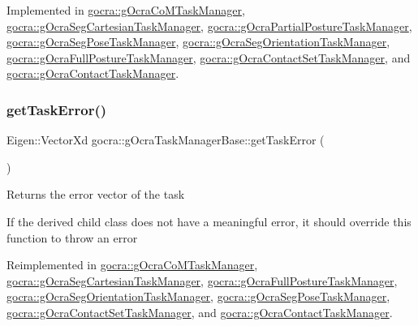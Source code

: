 Implemented in \hyperlink{classgocra_1_1gOcraCoMTaskManager_aec4b5fefd71eabb7ec71d0801a5bbf5f}{gocra\+::g\+Ocra\+Co\+M\+Task\+Manager}, \hyperlink{classgocra_1_1gOcraSegCartesianTaskManager_a0d74a81a6ba05ccbd509aa3362ae59aa}{gocra\+::g\+Ocra\+Seg\+Cartesian\+Task\+Manager}, \hyperlink{classgocra_1_1gOcraPartialPostureTaskManager_a393b7f72db340b4d2bed172fd3f3ae1d}{gocra\+::g\+Ocra\+Partial\+Posture\+Task\+Manager}, \hyperlink{classgocra_1_1gOcraSegPoseTaskManager_ab544efb740604150c99b020a5e1f04de}{gocra\+::g\+Ocra\+Seg\+Pose\+Task\+Manager}, \hyperlink{classgocra_1_1gOcraSegOrientationTaskManager_a5ebf0c1a5813c6a2895965d973f77539}{gocra\+::g\+Ocra\+Seg\+Orientation\+Task\+Manager}, \hyperlink{classgocra_1_1gOcraFullPostureTaskManager_aa53994ddf44ba5d9768ea3d3e5ba9931}{gocra\+::g\+Ocra\+Full\+Posture\+Task\+Manager}, \hyperlink{classgocra_1_1gOcraContactSetTaskManager_ad9f3b44b46253e5539e658cf3fd8ca37}{gocra\+::g\+Ocra\+Contact\+Set\+Task\+Manager}, and \hyperlink{classgocra_1_1gOcraContactTaskManager_adf02de85b4a661c70cd7e2031c1b7500}{gocra\+::g\+Ocra\+Contact\+Task\+Manager}.

\hypertarget{classgocra_1_1gOcraTaskManagerBase_a5c40a14b3a1d5a6519da422310d28f97}{}\label{classgocra_1_1gOcraTaskManagerBase_a5c40a14b3a1d5a6519da422310d28f97} 
\subsubsection{\texorpdfstring{get\+Task\+Error()}{getTaskError()}}
{\footnotesize\ttfamily Eigen\+::\+Vector\+Xd gocra\+::g\+Ocra\+Task\+Manager\+Base\+::get\+Task\+Error (\begin{DoxyParamCaption}{ }\end{DoxyParamCaption})\hspace{0.3cm}{\ttfamily [virtual]}}

Returns the error vector of the task

If the derived child class does not have a meaningful error, it should override this function to throw an error 

Reimplemented in \hyperlink{classgocra_1_1gOcraCoMTaskManager_a48cd88dc2fa3db834d3d4a17d39a8c30}{gocra\+::g\+Ocra\+Co\+M\+Task\+Manager}, \hyperlink{classgocra_1_1gOcraSegCartesianTaskManager_a12418bbcfafcc5f7aab8b6f8013880a4}{gocra\+::g\+Ocra\+Seg\+Cartesian\+Task\+Manager}, \hyperlink{classgocra_1_1gOcraFullPostureTaskManager_a8be4aac1fe7ec4f68e31f72a8aab6af8}{gocra\+::g\+Ocra\+Full\+Posture\+Task\+Manager}, \hyperlink{classgocra_1_1gOcraSegOrientationTaskManager_a37aa69c90bd5d3d0318de77aa56cd4dd}{gocra\+::g\+Ocra\+Seg\+Orientation\+Task\+Manager}, \hyperlink{classgocra_1_1gOcraSegPoseTaskManager_a059b69af0a960110bb14863f0179b1cd}{gocra\+::g\+Ocra\+Seg\+Pose\+Task\+Manager}, \hyperlink{classgocra_1_1gOcraContactSetTaskManager_aa0136e8702029873ba4d82c0edc7c571}{gocra\+::g\+Ocra\+Contact\+Set\+Task\+Manager}, and \hyperlink{classgocra_1_1gOcraContactTaskManager_a50ef70ceb95ced6818a5990fa6615d6a}{gocra\+::g\+Ocra\+Contact\+Task\+Manager}.



